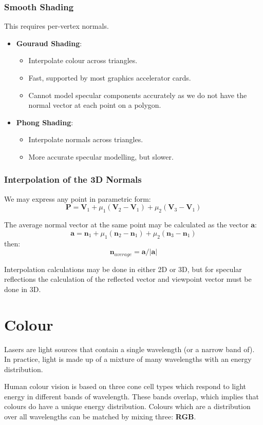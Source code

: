 \documentclass[11pt]{article}
\begin{document}
\subsubsection{Smooth Shading}
This requires per-vertex normals.
\begin{itemize}
  \item \textbf{Gouraud Shading}:
    \begin{itemize}
      \item Interpolate colour across triangles.
      \item Fast, supported by most graphics accelerator cards.
      \item Cannot model specular components accurately as we do not have the normal vector at each point on a polygon.
    \end{itemize}
  \item \textbf{Phong Shading}:
    \begin{itemize}
      \item Interpolate normals across triangles.
      \item More accurate specular modelling, but slower.
    \end{itemize}
\end{itemize}

\subsubsection{Interpolation of the 3D Normals}
We may express any point in parametric form:
\[
  \bm{P} = \bm{V}_1 + \mu_1 (\bm{V}_2 - \bm{V}_1) + \mu_2 (\bm{V}_3 - \bm{V}_1)
\]

The average normal vector at the same point may be calculated as the vector $\bm{a}$:
\[
  \bm{a} = \bm{n}_1 + \mu_1 (\bm{n}_2 - \bm{n}_1) + \mu_2 (\bm{n}_3 - \bm{n}_1)  
\]
then:
\[
  \bm{n}_{average} = \bm{a} / \lvert \bm{a} \rvert 
\]

Interpolation calculations may be done in either 2D or 3D, but for specular reflections the calculation of the reflected vector and viewpoint vector must be done in 3D.

\section{Colour}
Lasers are light sources that contain a single wavelength (or a narrow band of).
In practice, light is made up of a mixture of many wavelengths with an energy distribution.

Human colour vision is based on three cone cell types which respond to light energy in different bands of wavelength.
These bands overlap, which implies that colours do have a unique energy distribution.
Colours which are a distribution over all wavelengths can be matched by mixing three: \textbf{RGB}.
\end{document}
